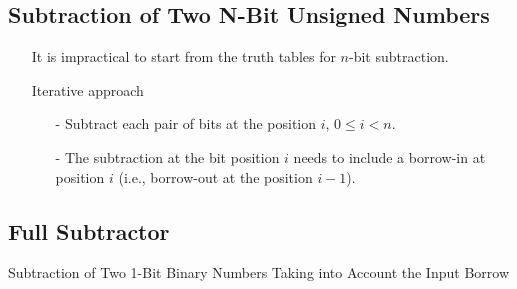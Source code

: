 \documentclass[12pt,openany]{book}
\begin{document}
			      	\subsection{Subtraction of Two N-Bit Unsigned Numbers}
			      	
			      	\begin{itemize}
			      		\item[] It is impractical to start from the truth tables for \( n \)-bit subtraction.
			      		\item[] Iterative approach
			      		      \begin{itemize}
			      		      	\item[-] Subtract each pair of bits at the position \( i \), \( 0 \leq i < n \).
			      		      	\item[-] The subtraction at the bit position \( i \) needs to include a borrow-in at position \( i \) (i.e., borrow-out at the position \( i - 1 \)).
			      		      \end{itemize}
			      	\end{itemize}
			      	
			      	\subsection{Full Subtractor}
			      	Subtraction of Two 1-Bit Binary Numbers Taking into Account the Input Borrow
			      	
\end{document}
